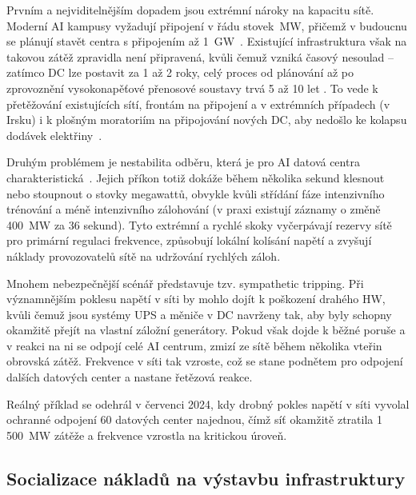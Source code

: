 Prvním a nejviditelnějším dopadem jsou extrémní nároky na kapacitu sítě. Moderní AI kampusy vyžadují připojení v řádu stovek~MW, přičemž v budoucnu se plánují stavět centra s připojením až 1~GW~\cite[s.~5]{chen_electricity_2025}. Existující infrastruktura však na takovou zátěž zpravidla není připravená, kvůli čemuž vzniká časový nesoulad -- zatímco DC lze postavit za 1 až 2 roky, celý proces od plánování až po zprovoznění vysokonapěťové přenosové soustavy trvá 5 až 10 let
\cites[s. 11]{ginzburg-ganz_technical_2025}[s. 13]{sheng_power_2026}. To vede k přetěžování existujících sítí, frontám na připojení a v extrémních případech (v Irsku) i k plošným moratoriím na připojování nových DC, aby nedošlo ke kolapsu dodávek elektřiny~\cite[s.~14]{sheng_power_2026}.

Druhým problémem je nestabilita odběru, která je pro AI datová centra charakteristická~\cite[s.~8--9]{sheng_power_2026}. Jejich příkon totiž dokáže během několika sekund klesnout nebo stoupnout o stovky megawattů, obvykle kvůli střídání fáze intenzivního trénování a méně intenzivního zálohování (v praxi existují záznamy o změně 400~MW za 36 sekund). Tyto extrémní a rychlé skoky vyčerpávají rezervy sítě pro primární regulaci frekvence, způsobují lokální kolísání napětí a zvyšují náklady provozovatelů sítě na udržování rychlých záloh.~\cite[s.~13]{ginzburg-ganz_technical_2025}

Mnohem nebezpečnější scénář představuje tzv. sympathetic tripping. Při významnějším poklesu napětí v síti by mohlo dojít k poškození drahého HW, kvůli čemuž jsou systémy UPS a měniče v DC navrženy tak, aby byly schopny okamžitě přejít na vlastní záložní generátory. Pokud však dojde k běžné poruše a v reakci na ni se odpojí celé AI centrum, zmizí ze sítě během několika vteřin obrovská zátěž. Frekvence v síti tak vzroste, což se stane podnětem pro odpojení dalších datových center a nastane řetězová reakce.~\cite[s.~11]{sheng_power_2026}

Reálný příklad se odehrál v červenci 2024, kdy drobný pokles napětí v síti vyvolal ochranné odpojení 60 datových center najednou, čímž síť okamžitě ztratila 1 500~MW zátěže a frekvence vzrostla na kritickou úroveň.~\cite[s.~13]{ginzburg-ganz_technical_2025}

\subsection{Socializace nákladů na výstavbu infrastruktury}
\label{subsec:energie_socializace}

